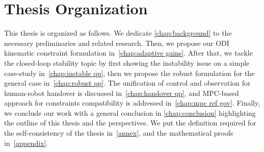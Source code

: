 \section*{Thesis Organization}
This thesis is organized as follows. We dedicate \cref{chap:background} to the necessary preliminaries and related research. Then, we propose our ODI kinematic constraint formulation in~\cref{chap:adaptive gains}. After that, we tackle the closed-loop stability topic by first showing the instability issue on a simple case-study in~\cref{chap:instable qp}, then we propose the robust formulation for the general case in~\cref{chap:robust qp}. The unification of control and observation for human-robot handover is discussed in~\cref{chap:handover qp}, and MPC-based approach for constraints compatibility is addressed in~\cref{chap:mpc ref gov}.  Finally, we conclude our work with a general conclusion in \cref{chap:conclusion} highlighting the outline of this thesis and the perspectives. We put the definition required for the self-consistency of the thesis in~\cref{annex}, and the mathematical proofs in~\cref{appendix}.
